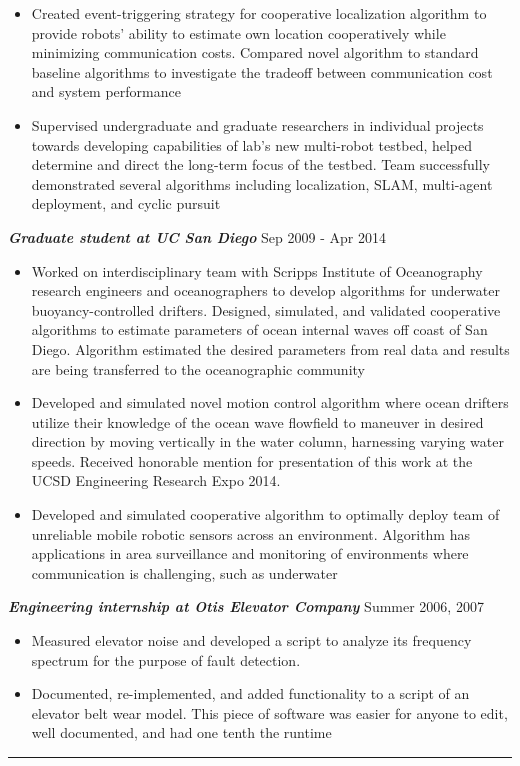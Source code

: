 \documentclass{res}
\begin{document}
\begin{resume}
\begin{itemize}
%
\item Created event-triggering strategy for cooperative localization algorithm to provide robots' ability to estimate own location cooperatively while minimizing communication costs. Compared novel algorithm to standard baseline algorithms to investigate the tradeoff between communication cost and system performance
\item Supervised undergraduate and graduate researchers in individual projects towards developing capabilities of lab's new multi-robot testbed, helped determine and direct the long-term focus of the testbed.  Team successfully demonstrated several algorithms including localization, SLAM, multi-agent deployment, and cyclic pursuit
\end{itemize}
\vspace*{-1ex}
{\sl  \bf Graduate student at UC San Diego} \hfill Sep 2009 - Apr 2014 
\begin{itemize}
\item Worked on interdisciplinary team with Scripps Institute of Oceanography research engineers and oceanographers to develop algorithms for underwater buoyancy-controlled drifters. Designed, simulated, and validated cooperative algorithms to estimate parameters of ocean internal waves off coast of San Diego.  Algorithm estimated the desired parameters from real data and results are being transferred to the oceanographic community
\item Developed and simulated novel motion control algorithm where ocean drifters utilize their knowledge of the ocean wave flowfield to maneuver in desired direction by moving vertically in the water column, harnessing varying water speeds. Received honorable mention for presentation of this work at the UCSD Engineering Research Expo 2014.
\item Developed and simulated cooperative algorithm to optimally deploy team of unreliable mobile robotic sensors across an environment. Algorithm has applications in area surveillance and monitoring of environments where communication is challenging, such as underwater
\end{itemize}
\vspace*{-2ex}
 {\sl \bf Engineering internship at Otis Elevator Company} \hfill Summer 2006, 2007 
\begin{itemize}
\item Measured elevator noise and developed a script to analyze its frequency spectrum for the purpose of fault detection. 
\item Documented, re-implemented, and added functionality to a script of an elevator belt wear model.  This piece of software was easier for anyone to edit, well documented, and had one tenth the runtime
\end{itemize}
%
 \vspace*{-3ex}
\hspace{-8.5ex}\rule{16.5cm}{0.4pt}
 \vspace*{-3ex}

\end{resume}
\end{document}
